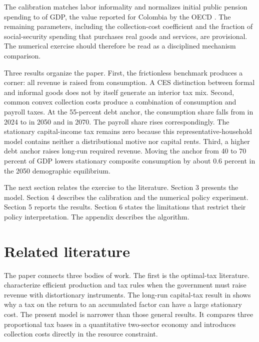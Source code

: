 \documentclass[12pt]{article}
\begin{document}
The calibration matches \BenchmarkInformality{} labor informality and
normalizes initial public pension spending to \BenchmarkOutlayShare{} of GDP,
the value reported for Colombia by the OECD
\citep{DANE2025Informality,OECD2023Colombia}. The remaining parameters,
including the collection-cost coefficient and the fraction of
social-security spending that purchases real goods and services, are
provisional. The numerical exercise should therefore be read as a disciplined
mechanism comparison.

Three results organize the paper. First, the frictionless benchmark produces
a corner: all revenue is raised from consumption. A CES distinction between
formal and informal goods does not by itself generate an interior tax mix.
Second, common convex collection costs produce a combination of consumption
and payroll taxes. At the 55-percent debt anchor, the consumption share falls
from \OptimalConsumptionShareTwentyTwentyFour{} in 2024 to
\OptimalConsumptionShareTwentyFifty{} in 2050 and
\OptimalConsumptionShareTwentySeventy{} in 2070. The payroll share rises
correspondingly. The stationary capital-income tax remains zero because this
representative-household model contains neither a distributional motive nor
capital rents. Third, a higher debt anchor raises long-run required revenue.
Moving the anchor from 40 to 70 percent of GDP lowers stationary composite
consumption by about 0.6 percent in the 2050 demographic equilibrium.

The next section relates the exercise to the literature. Section 3 presents
the model. Section 4 describes the calibration and the numerical policy
experiment. Section 5 reports the results. Section 6 states the limitations
that restrict their policy interpretation. The appendix describes the
algorithm.

\section{Related literature}

The paper connects three bodies of work. The first is the optimal-tax
literature. \citet{DiamondMirrlees1971a,DiamondMirrlees1971b} characterize
efficient production and tax rules when the government must raise revenue
with distortionary instruments. The long-run capital-tax result in
\citet{Chamley1986} shows why a tax on the return to an accumulated factor can
have a large stationary cost. The present model is narrower than those
general results. It compares three proportional tax bases in a quantitative
two-sector economy and introduces collection costs directly in the resource
constraint.
\end{document}
